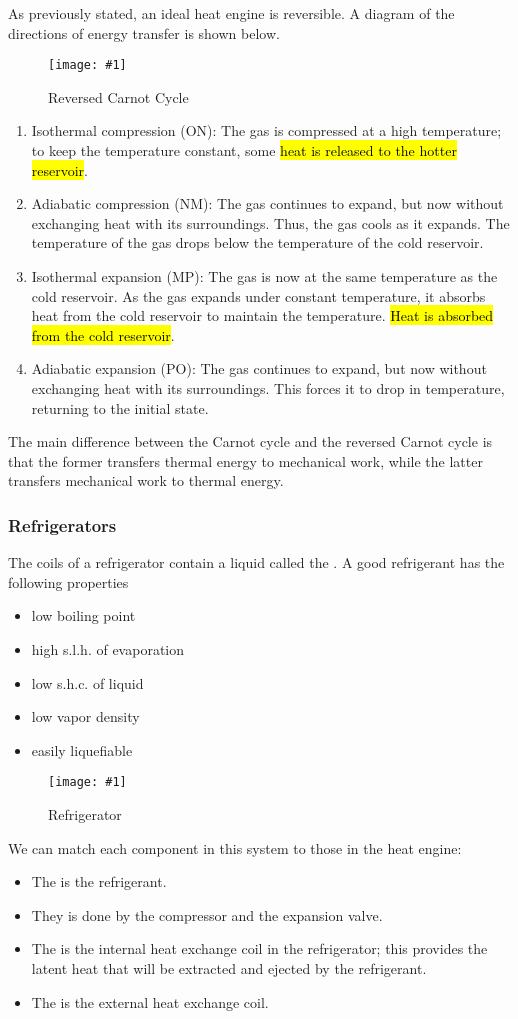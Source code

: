 \documentclass[a4paper,12pt]{article}
\newcommand{\img}[4]{\begin{center}
  \begin{figure}[H]
    \centering
    \texttt{[image: \#1]}
    \caption{#3}
    \label{fig:#4}
  \end{figure}
\end{center}}
\begin{document}
As previously stated, an ideal heat engine is reversible. A diagram of the directions of energy transfer is shown below.

\img{reversecarnot.jpg}{0.7}{Reversed Carnot Cycle}{reversed}

\begin{enumerate}
  \item Isothermal compression (ON): The gas is compressed at a high temperature; to keep the temperature constant, some \hl{heat is released to the hotter reservoir}.
  \item Adiabatic compression (NM): The gas continues to expand, but now without exchanging heat with its surroundings. Thus, the gas cools as it expands. The temperature of the gas drops below the temperature of the cold reservoir.
  \item Isothermal expansion (MP): The gas is now at the same temperature as the cold reservoir. As the gas expands under constant temperature, it absorbs heat from the cold reservoir to maintain the temperature. \hl{Heat is absorbed from the cold reservoir}.
  \item Adiabatic expansion (PO): The gas continues to expand, but now without exchanging heat with its surroundings. This forces it to drop in temperature, returning to the initial state.
\end{enumerate}

The main difference between the Carnot cycle and the reversed Carnot cycle is that the former transfers thermal energy to mechanical work, while the latter transfers mechanical work to thermal energy.

\subsubsection{Refrigerators}

The coils of a refrigerator contain a liquid called the . A good refrigerant has the following properties
\begin{itemize}
  \item low boiling point
  \item high s.l.h. of evaporation
  \item low s.h.c. of liquid
  \item low vapor density
  \item easily liquefiable
\end{itemize}

\img{refrigerator.png}{0.7}{Refrigerator}{refrigerator}
We can match each component in this system to those in the heat engine:
\begin{itemize}
  \item The  is the refrigerant.
  \item They  is done by the compressor and the expansion valve.
  \item The  is the internal heat exchange coil in the refrigerator; this provides the latent heat that will be extracted and ejected by the refrigerant.
  \item The  is the external heat exchange coil.
\end{itemize}
\end{document}
